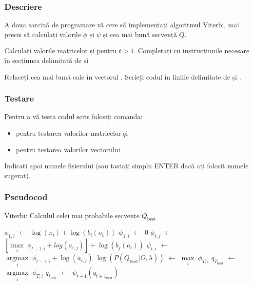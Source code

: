 \documentclass[12pt]{article}
\begin{document}
\subsubsection{Descriere}
\label{sec:desc-viterbi}

A doua sarcină de programare vă cere să implementați algoritmul
Viterbi, mai precis să calculați valorile $\phi$ și $\psi$ și cea mai
bună secvență $Q$.

Calculați valorile matricelor  și  pentru
$t>1$. Completați cu instrucțiunile necesare în secțiunea delimitată
de  și 


Refaceți cea mai bună cale în vectorul . Scrieți codul în
liniile delimitate de  și
.




\subsubsection{Testare}
\label{sec:test-viterbi}

Pentru a vă testa codul scris folosiți comanda:
\begin{itemize}
\item {} pentru testarea valorilor
  matricelor  și 
\item {} pentru testarea valorilor
  vectorului 
\end{itemize}
Indicați apoi numele fișierului (sau tastați simplu ENTER dacă ați
folosit numele sugerat).


\subsubsection{Pseudocod}
\label{sec:pseudocod-viterbi}

\begin{algorithm}[H]
  \caption{Viterbi: Calculul celei mai probabile secvențe $Q_{\text{best}}$}
  \label{alg:viterbi}
  \begin{algorithmic}[2]
    \STATE $\phi_{1,i}$ $\leftarrow$ $\log(\pi_{i}) + \log(b_i(o_1))$
    \STATE $\psi_{1,i}$ $\leftarrow$ $0$
    \ENDFOR
    \STATE $\phi_{t,j}$ $\leftarrow$ $[\underset{i}{\operatorname{max}}\; \phi_{t-1,i} +
    log(a_{i,j})] + \log(b_{j}(o_{t}))$
    \STATE $\psi_{t,i}$ $\leftarrow$ $\underset{i}{\operatorname{argmax}}\; \phi_{t-1,i} +
    \log(a_{i,j})$
    \ENDFOR
    \ENDFOR
    \STATE $\log(P(Q_{\text{best}} \vert O, \lambda))$ $\leftarrow$ $\underset{i}{\operatorname{max}}\; \phi_{T,i}$
    \STATE $q_{T_{\text{best}}}$ $\leftarrow$ $\underset{i}{\operatorname{argmax}}\; \phi_{T,i}$
    \STATE $q_{t_{\text{best}}}$ $\leftarrow$ $\psi_{t+1}(q_{t+1_{\text{best}}})$
    \ENDFOR
  \end{algorithmic} 
\end{algorithm}
 
\end{document}
